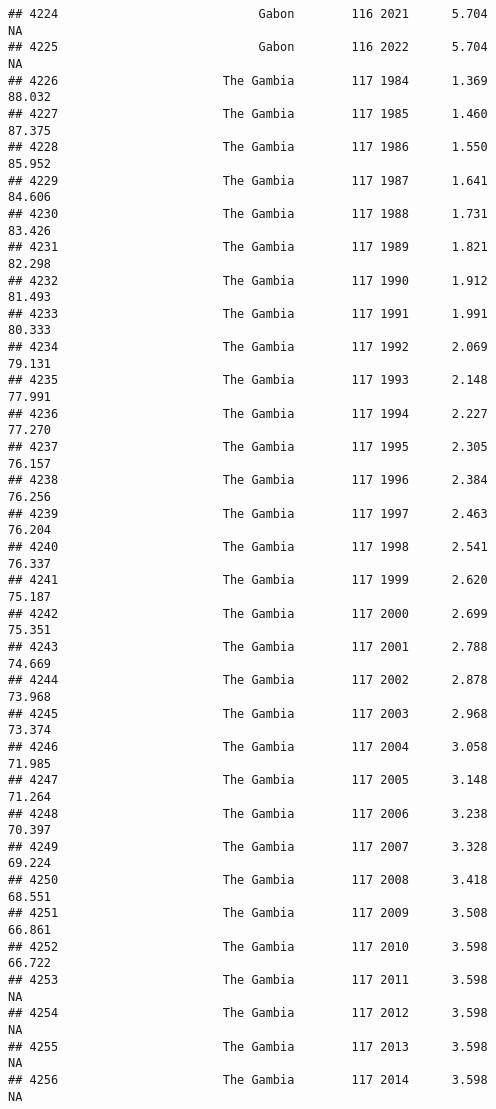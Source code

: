 \documentclass[
]{article}
\begin{document}
\begin{verbatim}
## 4224                            Gabon        116 2021      5.704         NA
## 4225                            Gabon        116 2022      5.704         NA
## 4226                       The Gambia        117 1984      1.369     88.032
## 4227                       The Gambia        117 1985      1.460     87.375
## 4228                       The Gambia        117 1986      1.550     85.952
## 4229                       The Gambia        117 1987      1.641     84.606
## 4230                       The Gambia        117 1988      1.731     83.426
## 4231                       The Gambia        117 1989      1.821     82.298
## 4232                       The Gambia        117 1990      1.912     81.493
## 4233                       The Gambia        117 1991      1.991     80.333
## 4234                       The Gambia        117 1992      2.069     79.131
## 4235                       The Gambia        117 1993      2.148     77.991
## 4236                       The Gambia        117 1994      2.227     77.270
## 4237                       The Gambia        117 1995      2.305     76.157
## 4238                       The Gambia        117 1996      2.384     76.256
## 4239                       The Gambia        117 1997      2.463     76.204
## 4240                       The Gambia        117 1998      2.541     76.337
## 4241                       The Gambia        117 1999      2.620     75.187
## 4242                       The Gambia        117 2000      2.699     75.351
## 4243                       The Gambia        117 2001      2.788     74.669
## 4244                       The Gambia        117 2002      2.878     73.968
## 4245                       The Gambia        117 2003      2.968     73.374
## 4246                       The Gambia        117 2004      3.058     71.985
## 4247                       The Gambia        117 2005      3.148     71.264
## 4248                       The Gambia        117 2006      3.238     70.397
## 4249                       The Gambia        117 2007      3.328     69.224
## 4250                       The Gambia        117 2008      3.418     68.551
## 4251                       The Gambia        117 2009      3.508     66.861
## 4252                       The Gambia        117 2010      3.598     66.722
## 4253                       The Gambia        117 2011      3.598         NA
## 4254                       The Gambia        117 2012      3.598         NA
## 4255                       The Gambia        117 2013      3.598         NA
## 4256                       The Gambia        117 2014      3.598         NA

\end{verbatim}
\end{document}
